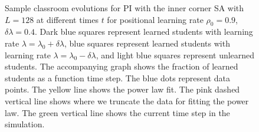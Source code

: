 \begin{figure}[htbp!]
   \caption[Example classroom evolution for heterogeneous PI set up with high positional learning factor $\rho_0$ and high heterogeneity $\delta\lambda$]{Sample classroom evolutions for PI with the inner corner SA with $L=128$ at different times $t$ for positional learning rate $\rho_0=0.9$, $\delta\lambda = 0.4$.
   Dark blue squares represent learned students with learning rate $\lambda = \lambda_0 + \delta\lambda$, blue squares represent learned students with learning rate $\lambda = \lambda_0 - \delta\lambda$, and light blue squares represent unlearned students.
   The accompanying graph shows the fraction of learned students as a function time step.
   The blue dots represent data points. 
   The yellow line shows the power law fit.
   The pink dashed vertical line shows where we truncate the data for fitting the power law.
   The green vertical line shows the current time step in the simulation.
   }
   \label{fig:2DBPCAIH sample class evolution high rho high delta}
\end{figure}

\newpage

